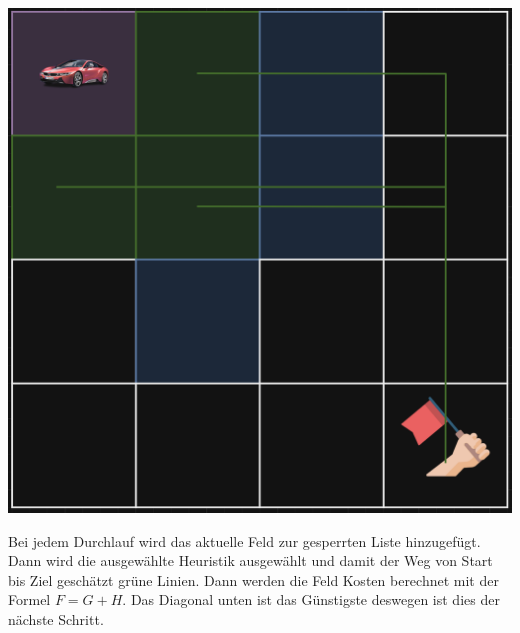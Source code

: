 {
\begin{minipage}{0.4\linewidth}
  \includegraphics[scale=.125]{Cars/img2.png}
\end{minipage}
\begin{minipage}{0.6\linewidth}
Bei jedem Durchlauf wird das aktuelle Feld zur gesperrten Liste hinzugefügt.\\
Dann wird die ausgewählte Heuristik ausgewählt und damit der Weg von Start bis Ziel geschätzt grüne Linien.
Dann werden die Feld Kosten berechnet mit der Formel \(F=G+H\). Das Diagonal unten ist das Günstigste deswegen ist dies der nächste Schritt.
\end{minipage}
}
